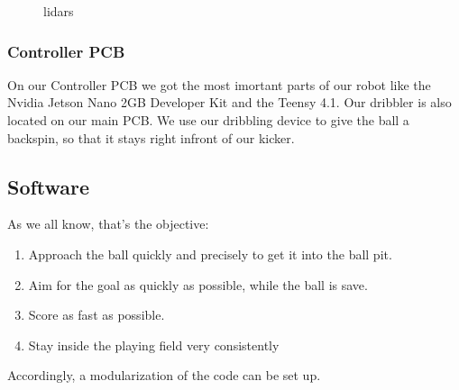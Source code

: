 \documentclass{scrartcl}
\begin{document}
\begin{figure}[!h]
    \begin{center}
    \caption{lidars}
    \label{lidars}
    \end{center}
    \end{figure}


\subsubsection{Controller PCB}

On our Controller PCB we got the most imortant parts of our robot like the Nvidia Jetson Nano 2GB Developer Kit
and the Teensy 4.1. Our dribbler is also located on our main PCB. We use our dribbling device
to give the ball a backspin, so that it stays right infront of our kicker. 

\subsection{Software} 
As we all know, that's the objective:
\begin{enumerate}
    \item{Approach the ball quickly and precisely to get it into the ball pit.}
    \item{Aim for the goal as quickly as possible, while the ball is save.}
    \item{Score as fast as possible.}
    \item {Stay inside the playing field very consistently}
\end{enumerate}
Accordingly, a modularization of the code can be set up.
\end{document}
